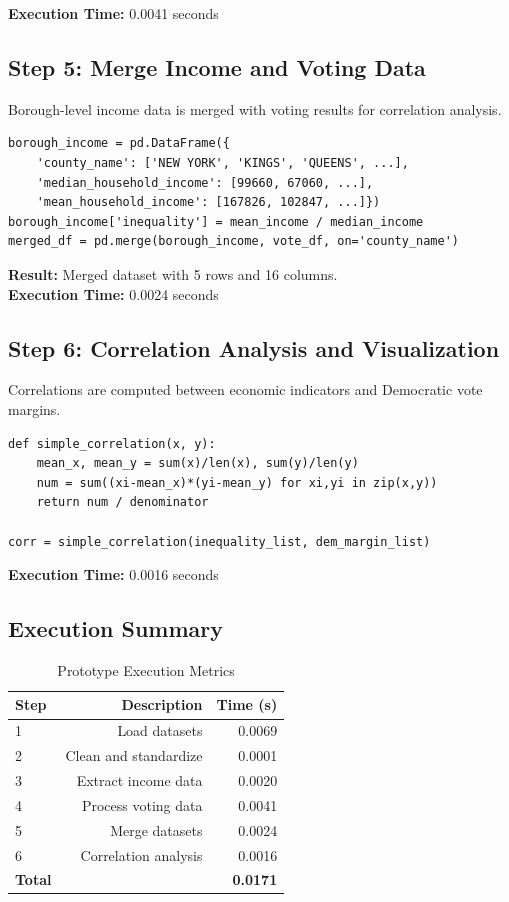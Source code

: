 \documentclass[11pt,a4paper]{article}
\begin{document}
\textbf{Execution Time:} 0.0041 seconds

\subsection{Step 5: Merge Income and Voting Data}

Borough-level income data is merged with voting results for correlation analysis.

\begin{verbatim}
borough_income = pd.DataFrame({
    'county_name': ['NEW YORK', 'KINGS', 'QUEENS', ...],
    'median_household_income': [99660, 67060, ...],
    'mean_household_income': [167826, 102847, ...]})
borough_income['inequality'] = mean_income / median_income
merged_df = pd.merge(borough_income, vote_df, on='county_name')
\end{verbatim}

\textbf{Result:} Merged dataset with 5 rows and 16 columns.\\
\textbf{Execution Time:} 0.0024 seconds

\subsection{Step 6: Correlation Analysis and Visualization}

Correlations are computed between economic indicators and Democratic vote margins.

\begin{verbatim}
def simple_correlation(x, y):
    mean_x, mean_y = sum(x)/len(x), sum(y)/len(y)
    num = sum((xi-mean_x)*(yi-mean_y) for xi,yi in zip(x,y))
    return num / denominator

corr = simple_correlation(inequality_list, dem_margin_list)
\end{verbatim}

\textbf{Execution Time:} 0.0016 seconds

\subsection{Execution Summary}

\begin{table}[htbp]
\centering
\caption{Prototype Execution Metrics}
\begin{tabular}{lrr}
\hline
Step & Description & Time (s) \\
\hline
1 & Load datasets & 0.0069 \\
2 & Clean and standardize & 0.0001 \\
3 & Extract income data & 0.0020 \\
4 & Process voting data & 0.0041 \\
5 & Merge datasets & 0.0024 \\
6 & Correlation analysis & 0.0016 \\
\hline
\textbf{Total} & & \textbf{0.0171} \\
\hline
\end{tabular}
\end{table}
\end{document}
